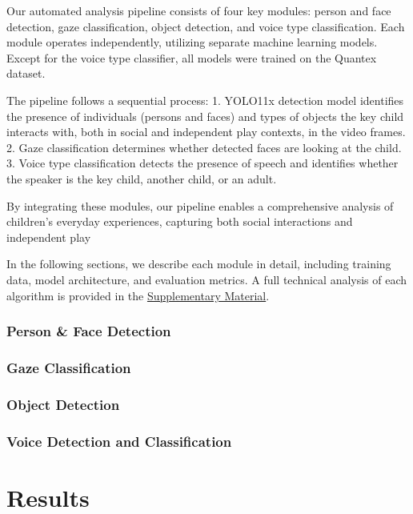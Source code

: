 \documentclass[
  man,floatsintext]{apa6}
\begin{document}
Our automated analysis pipeline consists of four key modules: person and face detection, gaze classification, object detection, and voice type classification. Each module operates independently, utilizing separate machine learning models. Except for the voice type classifier, all models were trained on the Quantex dataset.

The pipeline follows a sequential process:
1. YOLO11x detection model identifies the presence of individuals (persons and faces) and types of objects the key child interacts with, both in social and independent play contexts, in the video frames.
2. Gaze classification determines whether detected faces are looking at the child.
3. Voice type classification detects the presence of speech and identifies whether the speaker is the key child, another child, or an adult.

By integrating these modules, our pipeline enables a comprehensive analysis of children's everyday experiences, capturing both social interactions and independent play

In the following sections, we describe each module in detail, including training data, model architecture, and evaluation metrics. A full technical analysis of each algorithm is provided in the \hyperref[supplementary-material]{Supplementary Material}.

\subsubsection{Person \& Face Detection}\label{person-face-detection}

\subsubsection{Gaze Classification}\label{gaze-classification}

\subsubsection{Object Detection}\label{object-detection}

\subsubsection{Voice Detection and Classification}\label{voice-detection-and-classification}

\section{Results}\label{results}
\end{document}
